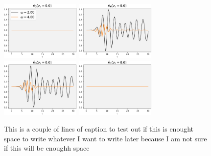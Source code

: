 \begin{figure}[!hbt]
    \centering
    \includegraphics[width=0.35\textwidth]{graph/occupation/occupation_site_2_vc_00.pdf}
    \includegraphics[width=0.35\textwidth]{graph/occupation/occupation_site_0_vc_00.pdf}
    \includegraphics[width=0.35\textwidth]{graph/occupation/occupation_site_3_vc_00.pdf}
    \includegraphics[width=0.35\textwidth]{graph/occupation/occupation_site_1_vc_00.pdf}
    \caption{This is a couple of lines of caption to test out if this is enought space to write whatever I want to write later because I am not sure if this will be enoughh space }
    \label{fig:my_label}
\end{figure}

